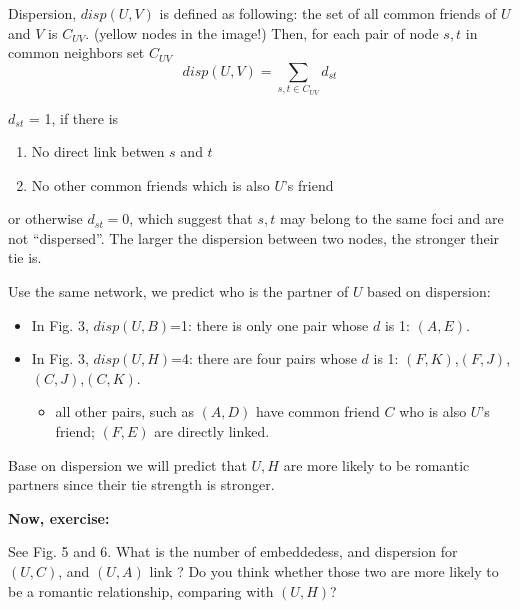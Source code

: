 \documentclass[]{article}
\begin{document}
Dispersion, $disp(U,V)$ is defined as following:
 the set of all common friends of $U$ and $V$ is
$C_{UV}$. (yellow nodes in the image!) Then, for each pair of node $s,t$
in common neighbors set $C_{UV}$
\[disp(U,V) = \sum_{s,t \in C_{UV}} d_{st}\]

$d_{st}$ = 1, if there is

\begin{enumerate}
\item
  No direct link betwen $s$ and $t$
\item
  No other common friends which is also $U$'s friend
\end{enumerate}

or otherwise $d_{st}=0$, which suggest that $s,t$ may belong to the same
foci and are not ``dispersed''.
The larger the dispersion between two nodes, the stronger their tie is. 

Use the same network, we predict who is the partner of $U$ based on dispersion:
\begin{itemize}
\itemsep1pt\parskip0pt
\item
  In Fig. 3, $disp(U,B)$=1: there is only one pair whose $d$ is
  1: $(A,E)$.
\item
  In Fig. 3, $disp(U,H)$=4: there are four pairs whose $d$ is 1:
  $(F,K)$,$(F,J)$,$(C,J)$,$(C,K)$.


  \begin{itemize}
  \itemsep1pt\parskip0pt
  \item
    all other pairs, such as $(A,D)$ have common friend $C$ who is also
    $U$'s friend; $(F,E)$ are directly linked.
  \end{itemize}
\end{itemize}
Base on dispersion we will predict that $U,H$ are more likely to be romantic partners since their tie strength is stronger.

\textbf{Now, exercise:}

See Fig. 5 and 6. What is the number of embeddedess, and dispersion
for $(U,C)$, and $(U,A)$ link ? Do you think whether those two are more likely to
be a romantic relationship, comparing with $(U,H)$?
\end{document}
